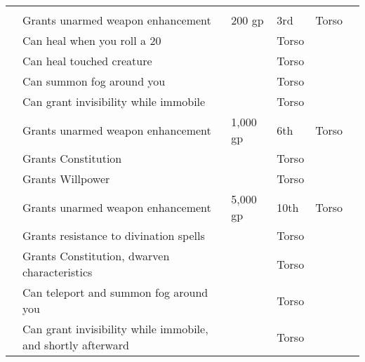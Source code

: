 \begin{longtabuwrapper}
\begin{longtabu}{l X l l l l}
                \midrule
                 &  &  &  &  &  \\
                  & Grants  unarmed weapon enhancement & 200 gp & 3rd & Torso &  \\
                 & Can heal when you roll a 20 &  & Torso &  \\
                 & Can heal touched creature &  & Torso &  \\
                 & Can summon fog around you &  & Torso &  \\
                 & Can grant invisibility while immobile &  & Torso &  \\
                  & Grants  unarmed weapon enhancement & 1,000 gp & 6th & Torso &  \\
                 & Grants  Constitution &  & Torso &  \\
                 & Grants  Willpower &  & Torso &  \\
                  & Grants  unarmed weapon enhancement & 5,000 gp & 10th & Torso &  \\
                 & Grants resistance to divination spells &  & Torso &  \\
                 & Grants  Constitution, dwarven characteristics &  & Torso &  \\
                 & Can teleport and summon fog around you &  & Torso &  \\
                 & Can grant invisibility while immobile, and shortly afterward  &  & Torso &  \\

\end{longtabu}
\end{longtabuwrapper}
